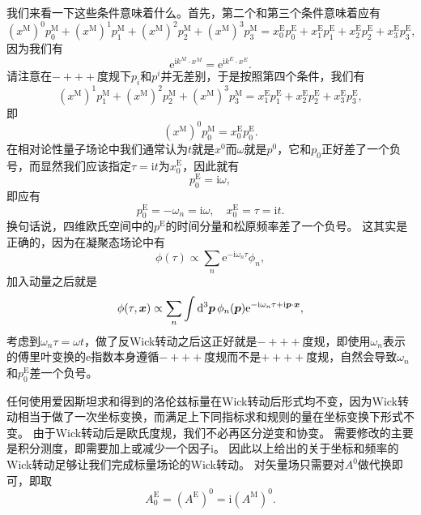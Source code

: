 \documentclass[hyperref, UTF8, a4paper]{ctexart}
\newcommand*{\ii}{\mathrm{i}}
\newcommand*{\ee}{\mathrm{e}}
\begin{document}
我们来看一下这些条件意味着什么。首先，第二个和第三个条件意味着应有
\[
    (x^\text{M})^0 p^\text{M}_0 + (x^\text{M})^1 p^\text{M}_1 + (x^\text{M})^2 p^\text{M}_2 + (x^\text{M})^3 p^\text{M}_3 = x^\text{E}_0 p^\text{E}_0 + x^\text{E}_1 p^\text{E}_1 + x^\text{E}_2 p^\text{E}_2 + x^\text{E}_3 p^\text{E}_3,
\]
因为我们有
\[
    \ee^{\ii k^M \cdot x^M} = \ee^{\ii k^E \cdot x^E}.
\]
请注意在$-+++$度规下$p_i$和$p^i$并无差别，于是按照第四个条件，我们有
\[
    (x^\text{M})^1 p^\text{M}_1 + (x^\text{M})^2 p^\text{M}_2 + (x^\text{M})^3 p^\text{M}_3 = x^\text{E}_1 p^\text{E}_1 + x^\text{E}_2 p^\text{E}_2 + x^\text{E}_3 p^\text{E}_3,
\]
即
\[
    (x^\text{M})^0 p^\text{M}_0 = x^\text{E}_0 p^\text{E}_0.
\]
在相对论性量子场论中我们通常认为$t$就是$x^0$而$\omega$就是$p^0$，它和$p_0$正好差了一个负号，而显然我们应该指定$\tau=\ii t$为$x^\text{E}_0$，因此就有
\[
    p_0^\text{E} = \ii \omega,
\]
即应有
\begin{equation}
    p_0^\text{E} = - \omega_n = \ii \omega, \quad x^\text{E}_0 = \tau = \ii t.
\end{equation}
换句话说，四维欧氏空间中的$p^\text{E}$的时间分量和松原频率差了一个负号。
这其实是正确的，因为在凝聚态场论中有
\[
    \phi(\tau) \propto \sum_n \ee^{-\ii \omega_n \tau} \phi_n,
\]
加入动量之后就是
\[
    \phi(\tau, \vb*{x}) \propto \sum_n \int \dd[3]{\vb*{p}} \phi_n(\vb*{p}) \ee^{-\ii \omega_n \tau + \ii \vb*{p} \cdot \vb*{x}} , 
\]
考虑到$\omega_n \tau = \omega t$，做了反Wick转动之后这正好就是$-+++$度规，即使用$\omega_n$表示的傅里叶变换的$\ee$指数本身遵循$-+++$度规而不是$++++$度规，自然会导致$\omega_n$和$p^\text{E}_0$差一个负号。

任何使用爱因斯坦求和得到的洛伦兹标量在Wick转动后形式均不变，因为Wick转动相当于做了一次坐标变换，而满足上下同指标求和规则的量在坐标变换下形式不变。
由于Wick转动后是欧氏度规，我们不必再区分逆变和协变。
需要修改的主要是积分测度，即需要加上或减少一个因子$\ii$。
因此以上给出的关于坐标和频率的Wick转动足够让我们完成标量场论的Wick转动。
对矢量场只需要对$A^0$做代换即可，即取
\begin{equation}
    A^\text{E}_0 = (A^\text{E})^0 = \ii (A^\text{M})^0.
\end{equation}
\end{document}
